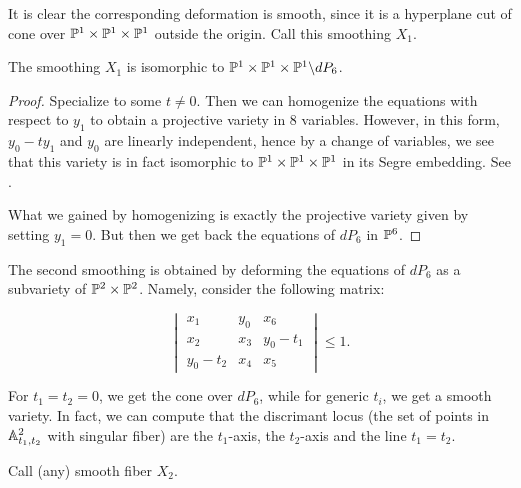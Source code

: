 It is clear the corresponding deformation is smooth, since it is a hyperplane cut of cone over $\mathbb{P}^1 \times \mathbb{P}^1 \times \mathbb{P}^1$ outside the origin. Call this smoothing $X_1$.

\begin{lemma}
The smoothing $X_1$ is isomorphic to $\mathbb{P}^1 \times \mathbb{P}^1 \times \mathbb{P}^1 \backslash dP_6$.
\end{lemma}
\begin{proof}
Specialize to some $t \neq 0$. Then we can homogenize the equations with respect to $y_1$ to obtain a projective variety in $8$ variables. However, in this form, $y_0-ty_1$ and $y_0$ are linearly independent, hence by a change of variables, we see that this variety is in fact isomorphic to $\mathbb{P}^1 \times \mathbb{P}^1 \times \mathbb{P}^1$ in its Segre embedding. See .

What we gained by homogenizing is exactly the projective variety given by setting $y_1=0$. But then we get back the equations of $dP_6$ in $\mathbb{P}^6$.
\end{proof}

The second smoothing is obtained by deforming the equations of $dP_6$ as a subvariety of $\mathbb{P}^2 \times \mathbb{P}^2$. Namely, consider the following matrix:

\begin{equation}
\label{eq:def2}
\begin{vmatrix}
x_1 & y_0 & x_6 \\
x_2 & x_3 & y_0-t_1 \\
y_0-t_2 & x_4 & x_5
\end{vmatrix} \leq 1.
\end{equation}


For $t_1=t_2=0$, we get the cone over $dP_6$, while for generic $t_i$, we get a smooth variety. In fact, we can compute that the discrimant locus (the set of points in $\mathbb{A}^2_{t_1,t_2}$ with singular fiber) are the $t_1$-axis, the $t_2$-axis and the line $t_1=t_2$. 

Call (any) smooth fiber $X_2$. 

